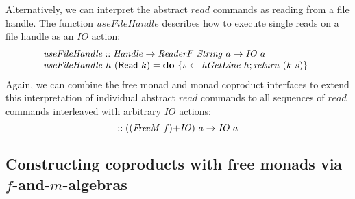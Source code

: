 \documentclass{jfp1}
\newcommand{\fmext}[1]{\langle\langle #1 \rangle\rangle}
\newcommand{\kw}[1]{\textbf{#1}}
\begin{document}
Alternatively, we can interpret the abstract $\mathit{read}$ commands
as reading from a file handle. The function $\mathit{useFileHandle}$
describes how to execute single reads on a file handle as an $\mathit{IO}$ action:
\begin{displaymath}
  \begin{array}{@{}l}
    \mathit{useFileHandle} :: \mathit{Handle} \to \mathit{ReaderF}~\mathit{String}~a \to \mathit{IO}~a \\
    \mathit{useFileHandle}~h~(\mathsf{Read}~k) = \kw{do}~\{ s \leftarrow \mathit{hGetLine}~h; \mathit{return}~(k~s) \}
  \end{array}
\end{displaymath}
Again, we can combine the free monad and monad coproduct interfaces to
extend this interpretation of individual abstract $\mathit{read}$
commands to all sequences of $\mathit{read}$ commands interleaved with
arbitrary $\mathit{IO}$ actions:
\begin{displaymath}
  [\fmext{\mathit{useFileHandle}}, \mathit{id}] :: (\cprd{(\mathit{FreeM}~f)}{\mathit{IO}})~a \to \mathit{IO}~a
\end{displaymath}

\subsection{Constructing coproducts with free monads via $f$-and-$m$-algebras}
\label{sec:construct-coproducts}
\end{document}
